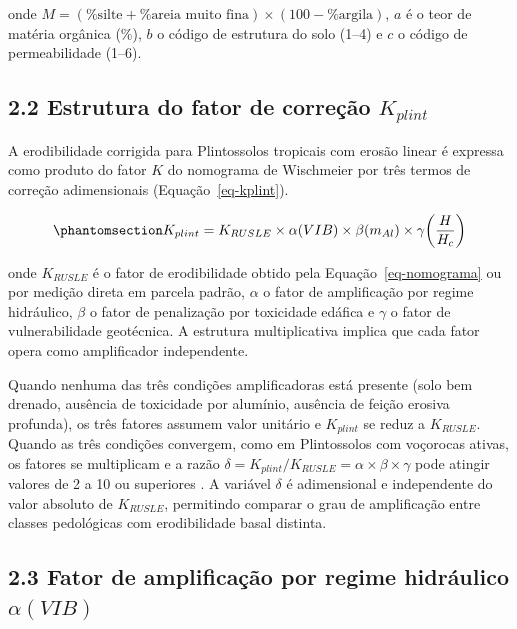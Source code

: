 \documentclass[
  brazilian,
  authoryear,
  preprint]{elsarticle}
\begin{document}
onde
\(M = (\%\text{silte} + \%\text{areia muito fina}) \times (100 - \%\text{argila})\),
\(a\) é o teor de matéria orgânica (\%), \(b\) o código de estrutura do
solo (1--4) e \(c\) o código de permeabilidade (1--6).

\subsection{\texorpdfstring{2.2 Estrutura do fator de correção
\(K_{plint}\)}{2.2 Estrutura do fator de correção K\_\{plint\}}}\label{estrutura-do-fator-de-correuxe7uxe3o-k_plint}

A erodibilidade corrigida para Plintossolos tropicais com erosão linear
é expressa como produto do fator \(K\) do nomograma de Wischmeier por
três termos de correção adimensionais (Equação~\ref{eq-kplint}).

\begin{equation}\phantomsection\label{eq-kplint}{
K_{plint} = K_{RUSLE} \times \alpha(VIB) \times \beta(m_{Al}) \times \gamma\!\left(\dfrac{H}{H_c}\right)
}\end{equation}

onde \(K_{RUSLE}\) é o fator de erodibilidade obtido pela
Equação~\ref{eq-nomograma} ou por medição direta em parcela padrão,
\(\alpha\) o fator de amplificação por regime hidráulico, \(\beta\) o
fator de penalização por toxicidade edáfica e \(\gamma\) o fator de
vulnerabilidade geotécnica. A estrutura multiplicativa implica que cada
fator opera como amplificador independente.

Quando nenhuma das três condições amplificadoras está presente (solo bem
drenado, ausência de toxicidade por alumínio, ausência de feição erosiva
profunda), os três fatores assumem valor unitário e \(K_{plint}\) se
reduz a \(K_{RUSLE}\). Quando as três condições convergem, como em
Plintossolos com voçorocas ativas, os fatores se multiplicam e a razão
\(\delta = K_{plint}/K_{RUSLE} = \alpha \times \beta \times \gamma\)
pode atingir valores de 2 a 10 ou superiores \citep{poesen_2018}. A
variável \(\delta\) é adimensional e independente do valor absoluto de
\(K_{RUSLE}\), permitindo comparar o grau de amplificação entre classes
pedológicas com erodibilidade basal distinta.

\subsection{\texorpdfstring{2.3 Fator de amplificação por regime
hidráulico
\(\alpha(VIB)\)}{2.3 Fator de amplificação por regime hidráulico \textbackslash alpha(VIB)}}\label{fator-de-amplificauxe7uxe3o-por-regime-hidruxe1ulico-alphavib}
\end{document}
